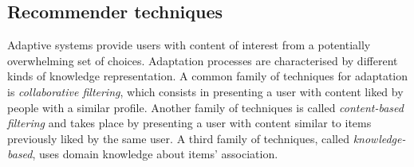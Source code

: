 % 
% 





\subsection{Recommender techniques} %
\label{sub:adaptation_techniques_item_based_and_user_based}

Adaptive systems provide users with content of interest from a potentially overwhelming set of choices.  
Adaptation processes are characterised by different kinds of knowledge representation. %
A common family of techniques for adaptation is \emph{collaborative filtering}, which consists in presenting a user with content liked by people with a similar profile.
Another family of techniques is called \emph{content-based filtering} and takes place by presenting a user with content similar to items previously liked by the same user.
A third family of techniques, called \emph{knowledge-based}, uses domain knowledge about items' association.

